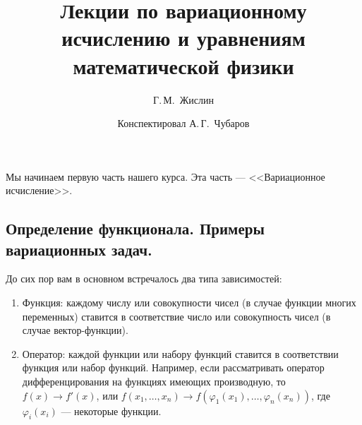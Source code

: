\documentclass[12pt,a4paper,openany,fleqn]{book}
\theoremstyle{definition}
\begin{document}
	\author{Г.\,М.~Жислин}
	\title{Лекции по вариационному исчислению и уравнениям математической физики}
	\date{Конспектировал А.\,Г.~Чубаров}
	
	
	
	\maketitle
	
	
	\renewcommand{\thepart}{\Asbuk{part}}
	\renewcommand{\thechapter}{\arabic{chapter}}
	\renewcommand{\thesection}{\arabic{section}}
	\renewcommand{\thesubsection}{\Roman{subsection}}
	\renewcommand{\thefootnote}{\roman{footnote}}
	\renewcommand{\phi}{\varphi}

	
	\chapter{}
	\label{lecture1}
	Мы начинаем первую часть нашего курса. Эта часть --- <<Вариационное исчисление>>.
	\section{Определение функционала. Примеры вариационных задач.}
	\label{lecture1section1}
	До сих пор вам в основном встречалось два типа зависимостей:
	\begin{enumerate}
		\item Функция: каждому числу или совокупности чисел (в случае функции многих переменных) ставится в соответствие число или совокупность чисел (в случае вектор-функции).
		
		\item Оператор: каждой функции или набору функций ставится в соответствии функция или набор функций. Например, если рассматривать оператор дифференцирования на функциях имеющих производную, то $f(x)\to f'(x)$, или $f(x_1,\ldots,x_n)\to f(\phi_1(x_1),\ldots,\phi_n(x_n))$, где \\ $\phi_i(x_i)$ --- некоторые функции.
		
	\end{enumerate}
	
\end{document}
